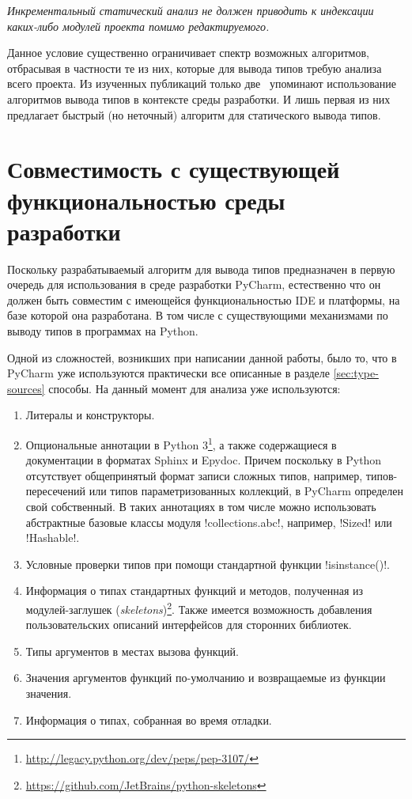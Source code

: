 \emph{Инкрементальный статический анализ не должен приводить к индексации 
 каких-либо модулей проекта помимо редактируемого.}

Данное условие существенно ограничивает спектр возможных алгоритмов, отбрасывая
в частности те из них, которые для вывода типов требую анализа всего проекта. Из
 изученных публикаций только две~\cite{Pluquet2009,Haupt2011} упоминают
использование алгоритмов вывода типов в контексте среды разработки. И лишь
первая из них предлагает быстрый (но неточный) алгоритм для статического вывода типов.

\section{Совместимость с существующей функциональностью среды разработки}
\label{sec:compatibility-requirement}

Поскольку разрабатываемый алгоритм для вывода типов предназначен в первую
очередь для использования в среде разработки PyCharm, естественно что он должен
быть совместим с имеющейся функциональностью IDE и платформы, на базе которой
она разработана. В том числе с существующими механизмами по выводу типов в
программах на Python. 

Одной из сложностей, возникших при написании данной работы, было то, что в
PyCharm уже используются практически все описанные в разделе
\ref{sec:type-sources} способы. На данный момент для анализа уже используются:

\begin{enumerate}
    \item Литералы и конструкторы.

    \item Опциональные аннотации в Python
      3\footnote{\url{http://legacy.python.org/dev/peps/pep-3107/}}, а также
      содержащиеся в документации в форматах Sphinx и Epydoc. Причем поскольку в
      Python отсутствует общепринятый формат записи сложных типов, например,
      типов-пересечений или типов параметризованных коллекций, в PyCharm
      определен свой собственный.
      В таких аннотациях в том числе можно использовать абстрактные базовые
      классы модуля !collections.abc!, например, !Sized! или !Hashable!.

    \item Условные проверки типов при помощи стандартной функции !isinstance()!.

    \item Информация о типах стандартных функций и методов, полученная из
        модулей-заглушек
        (\emph{skeletons})\footnote{\url{https://github.com/JetBrains/python-skeletons}}.
        Также имеется возможность добавления пользовательских описаний
        интерфейсов для сторонних библиотек.

    \item Типы аргументов в местах вызова функций.

    \item Значения аргументов функций по-умолчанию и возвращаемые из функции
        значения.

    \item Информация о типах, собранная во время отладки.
\end{enumerate}

